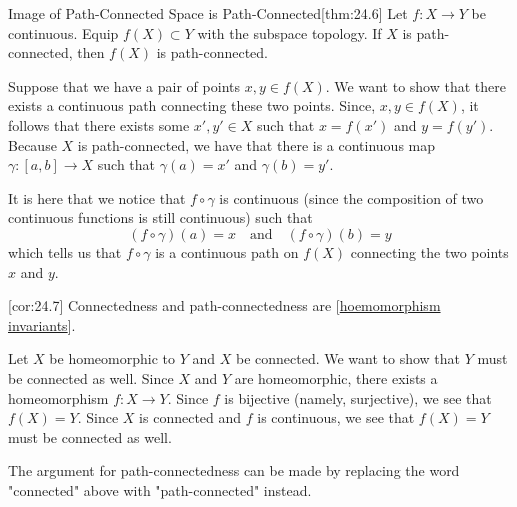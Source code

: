 \begin{thmBox}{Image of Path-Connected Space is Path-Connected}[thm:24.6]
    Let \( f: X \rightarrow Y \) be continuous.
    Equip \( f ( X ) \subset Y \) with the subspace topology.
    If \( X \) is path-connected, then \( f ( X ) \) is path-connected.

    \baseRule

    \begin{proofBox}
        Suppose that we have a pair of points \( x, y \in f ( X ) \).
        We want to show that there exists a continuous path connecting these
        two points.
        Since, \( x, y \in f ( X ) \), it follows that there exists some 
        \( x', y' \in X \) such that \( x = f ( x' ) \) and \( y = f ( y' ) \).
        Because \( X \) is path-connected, we have that there is a continuous
        map \( \gamma: [ a, b ] \rightarrow X \) such that 
        \( \gamma ( a ) = x' \) and \( \gamma ( b ) = y' \).

        \baseSkip

        It is here that we notice that \( f \circ \gamma \) is continuous 
        (since the composition of two continuous functions is still continuous)
        such that 
        \begin{equation*}
            ( f \circ \gamma ) ( a ) = x
            \quad \mathrm{and} \quad 
            ( f \circ \gamma ) ( b ) = y
        \end{equation*}
        which tells us that \( f \circ \gamma \) is a continuous path on 
        \( f ( X ) \) connecting the two points \( x \) and \( y \).
    \end{proofBox}
\end{thmBox}

\begin{thmBox}[Corollary]{}[cor:24.7]
    Connectedness and path-connectedness are 
    [\hyperlink{18_homeomorphism_invariant}{hoemomorphism invariants}].

    \baseRule

    \begin{proofBox}
        Let \( X \) be homeomorphic to \( Y \) and \( X \) be connected.
        We want to show that \( Y \) must be connected as well.
        Since \( X \) and \( Y \) are homeomorphic, there exists a 
        homeomorphism \( f: X \rightarrow Y \).
        Since \( f \) is bijective (namely, surjective), we see that 
        \( f ( X ) = Y \).
        Since \( X \) is connected and \( f \) is continuous, we see that 
        \( f ( X ) = Y \) must be connected as well.

        \baseSkip

        The argument for path-connectedness can be made by replacing the word 
        "connected" above with "path-connected" instead.
    \end{proofBox}
\end{thmBox}